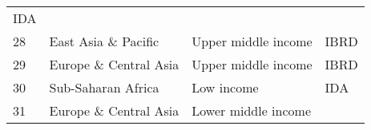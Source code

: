 \documentclass[
]{article}
\begin{document}
\begin{longtable}[]{@{}llll@{}}
\begin{minipage}[t]{0.16\columnwidth}
IDA\strut
\end{minipage}\tabularnewline
\begin{minipage}[t]{0.06\columnwidth}\raggedright
28\strut
\end{minipage} & \begin{minipage}[t]{0.17\columnwidth}\raggedright
East Asia \& Pacific\strut
\end{minipage} & \begin{minipage}[t]{0.11\columnwidth}\raggedright
Upper middle income\strut
\end{minipage} & \begin{minipage}[t]{0.16\columnwidth}\raggedright
IBRD\strut
\end{minipage}\tabularnewline
\begin{minipage}[t]{0.06\columnwidth}\raggedright
29\strut
\end{minipage} & \begin{minipage}[t]{0.17\columnwidth}\raggedright
Europe \& Central Asia\strut
\end{minipage} & \begin{minipage}[t]{0.11\columnwidth}\raggedright
Upper middle income\strut
\end{minipage} & \begin{minipage}[t]{0.16\columnwidth}\raggedright
IBRD\strut
\end{minipage}\tabularnewline
\begin{minipage}[t]{0.06\columnwidth}\raggedright
30\strut
\end{minipage} & \begin{minipage}[t]{0.17\columnwidth}\raggedright
Sub-Saharan Africa\strut
\end{minipage} & \begin{minipage}[t]{0.11\columnwidth}\raggedright
Low income\strut
\end{minipage} & \begin{minipage}[t]{0.16\columnwidth}\raggedright
IDA\strut
\end{minipage}\tabularnewline
\begin{minipage}[t]{0.06\columnwidth}\raggedright
31\strut
\end{minipage} & \begin{minipage}[t]{0.17\columnwidth}\raggedright
Europe \& Central Asia\strut
\end{minipage} & \begin{minipage}[t]{0.11\columnwidth}\raggedright
Lower middle income\strut
\end{minipage} & \begin{minipage}[t]{0.16\columnwidth}\raggedright

\end{minipage}
\end{longtable}
\end{document}
